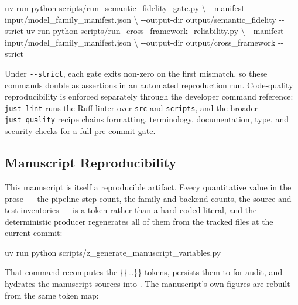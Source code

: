 \documentclass[
  english,
  9pt,
]{extarticle}
\newenvironment{Shaded}{}{}
\newcommand{\AttributeTok}[1]{\textcolor[rgb]{0.49,0.56,0.16}{#1}}
\newcommand{\DataTypeTok}[1]{\textcolor[rgb]{0.56,0.13,0.00}{#1}}
\newcommand{\ExtensionTok}[1]{#1}
\newcommand{\NormalTok}[1]{#1}
\begin{document}
\begin{Shaded}
\begin{Highlighting}[]
\ExtensionTok{uv}\NormalTok{ run python scripts/run\_semantic\_fidelity\_gate.py }\DataTypeTok{\textbackslash{}}
  \AttributeTok{{-}{-}manifest}\NormalTok{ input/model\_family\_manifest.json }\DataTypeTok{\textbackslash{}}
  \AttributeTok{{-}{-}output{-}dir}\NormalTok{ output/semantic\_fidelity }\AttributeTok{{-}{-}strict}
\ExtensionTok{uv}\NormalTok{ run python scripts/run\_cross\_framework\_reliability.py }\DataTypeTok{\textbackslash{}}
  \AttributeTok{{-}{-}manifest}\NormalTok{ input/model\_family\_manifest.json }\DataTypeTok{\textbackslash{}}
  \AttributeTok{{-}{-}output{-}dir}\NormalTok{ output/cross\_framework }\AttributeTok{{-}{-}strict}
\end{Highlighting}
\end{Shaded}

Under \texttt{-\/-strict}, each gate exits non-zero on the first
mismatch, so these commands double as assertions in an automated
reproduction run. Code-quality reproducibility is enforced separately
through the developer command reference: \texttt{just\ lint} runs the
Ruff linter over \texttt{src} and \texttt{scripts}, and the broader
\texttt{just\ quality} recipe chains formatting, terminology,
documentation, type, and security checks for a full pre-commit gate.

\subsection{Manuscript
Reproducibility}\label{manuscript-reproducibility}

This manuscript is itself a reproducible artifact. Every quantitative
value in the prose --- the pipeline step count, the family and backend
counts, the source and test inventories --- is a token rather than a
hard-coded literal, and the deterministic producer regenerates all of
them from the tracked files at the current commit:

\begin{Shaded}
\begin{Highlighting}[]
\ExtensionTok{uv}\NormalTok{ run python scripts/z\_generate\_manuscript\_variables.py}
\end{Highlighting}
\end{Shaded}

That command recomputes the \{\{\ldots\}\} tokens, persists them to
 for audit, and hydrates
the manuscript sources into . The
manuscript's own figures are rebuilt from the same token map:
\end{document}
